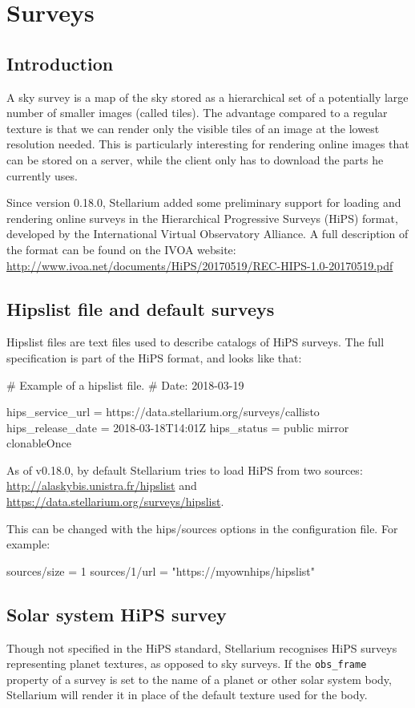 
\chapter{Surveys}
\label{ch:surveys}

\section{Introduction}
\label{sec:surveys:introduction}


A sky survey is a map of the sky stored as a hierarchical set of a potentially
large number of smaller images (called tiles).  The advantage compared to a
regular texture is that we can render only the visible tiles of an image at the
lowest resolution needed.  This is particularly interesting for rendering
online images that can be stored on a server, while the client only has
to download the parts he currently uses.

Since version 0.18.0, Stellarium added some preliminary support for loading and
rendering online surveys in the Hierarchical Progressive Surveys (HiPS) format,
developed by the International Virtual Observatory Alliance.
A full description of the format can be found on the IVOA website:
\url{http://www.ivoa.net/documents/HiPS/20170519/REC-HIPS-1.0-20170519.pdf}

\section{Hipslist file and default surveys}
\label{sec:surveys:hipslistFile}

Hipslist files are text files used to describe catalogs of HiPS surveys.  The
full specification is part of the HiPS format, and looks like that:

\begin{configfile}
# Example of a hipslist file.
# Date: 2018-03-19

hips_service_url  = https://data.stellarium.org/surveys/callisto
hips_release_date = 2018-03-18T14:01Z
hips_status       = public mirror clonableOnce
\end{configfile}

As of v0.18.0, by default Stellarium tries to load HiPS from two sources:
\url{http://alaskybis.unistra.fr/hipslist} and
\url{https://data.stellarium.org/surveys/hipslist}.

This can be changed with the hips/sources options in the configuration
file.  For example:

\begin{configfile}
[hips]
sources/size = 1
sources/1/url = "https://myownhips/hipslist"

\end{configfile}

\section{Solar system HiPS survey}

Though not specified in the HiPS standard, Stellarium recognises HiPS surveys
representing planet textures, as opposed to sky surveys.  If the
\texttt{obs\_frame} property of a survey is set to the name of a planet or
other solar system body, Stellarium will render it in place of the default
texture used for the body.
